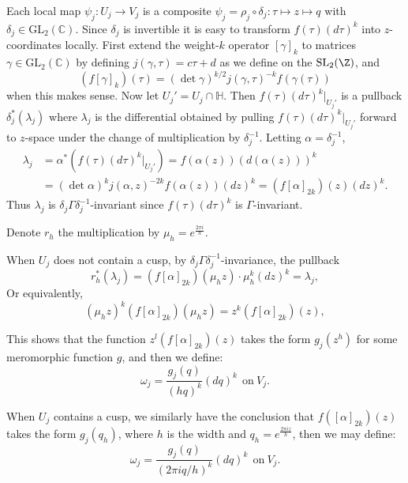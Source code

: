 \begin{enumerate}[1]
\begin{proofc}[解答]
\begin{itemize}
Each local map \( \psi_j : U_j \longrightarrow V_j \) is a composite \( \psi_j = \rho_j \circ \delta_j : \tau \mapsto z \mapsto q \) with \( \delta_j \in \mathrm{GL}_2(\mathbb{C}) \). 
Since \( \delta_j \) is invertible it is easy to transform \( f(\tau)(d\tau)^k \) into \( z \)-coordinates locally. 
First extend the weight-\( k \) operator \( [\gamma]_k \) to matrices \( \gamma \in \mathrm{GL}_2(\mathbb{C}) \) by defining \( j(\gamma, \tau) = c\tau + d \) as 
we define on the $\mathrm{SL}_2(\Z)$, and
\[
(f[\gamma]_k)(\tau) = (\det \gamma)^{k/2}j(\gamma, \tau)^{-k}f(\gamma(\tau))
\]
when this makes sense. Now let \( U_j' = U_j \cap \mathbb{H} \). 
Then \( f(\tau)(d\tau)^k |_{U_j'} \) is a pullback \( \delta_j^*(\lambda_j) \) where \( \lambda_j \) is the differential obtained by pulling \( f(\tau)(d\tau)^k |_{U_j'} \) forward to \( z \)-space 
under the change of multiplication by \( \delta_j^{-1} \). Letting \( \alpha = \delta_j^{-1} \),
\[
\begin{aligned}
\lambda_j &= \alpha^*(f(\tau)(d\tau)^k |_{U_j'}) = f(\alpha(z))(d(\alpha(z)))^k \\
&= (\det \alpha)^k j(\alpha, z)^{-2k}f(\alpha(z))(dz)^k = (f[\alpha]_{2k})(z)(dz)^k.
\end{aligned}
\]
Thus \( \lambda_j \) is \( \delta_j \Gamma \delta_j^{-1} \)-invariant since \( f(\tau)(d\tau)^k \) is \( \Gamma \)-invariant. 

Denote $r_h$ the multiplication by $\mu_h = e^{\frac{2\pi i}{h}}$.

When $U_j$ does not contain a cusp, by $\delta_j \Gamma \delta_j^{-1}$-invariance, the pullback 
$$r_{h}^*(\lambda_j) = (f[\alpha]_{2k})(\mu_h z)\cdot \mu_h^k (dz)^k = \lambda_j,$$
Or equivalently, 
$$(\mu_h z)^k (f[\alpha]_{2k})(\mu_h z ) = z^k (f[\alpha]_{2k})(z),$$

This shows that the function $z^l (f[\alpha]_{2k})(z)$ takes the form $g_j(z^h)$ for some meromorphic function $g$, and then we define:
\begin{equation}
    \omega_j = \frac{g_j(q)}{(hq)^k}(dq)^k \ \ \text{on} \  V_j. \label{eq1}
\end{equation}

When $U_j$ contains a cusp, we similarly have the conclusion that $f([\alpha]_{2k})(z)$ takes the form $g_j(q_h)$, where $h$ is the width and $q_h = e^{\frac{2\pi i z}{h}}$,
then we may define:
\begin{equation}
    \omega_j = \frac{g_j(q)}{(2\pi i q/h)^k}(dq)^k \ \ \text{on} \  V_j. \label{eq2}
\end{equation}
 

\end{itemize}
\end{proofc}
\end{enumerate}
